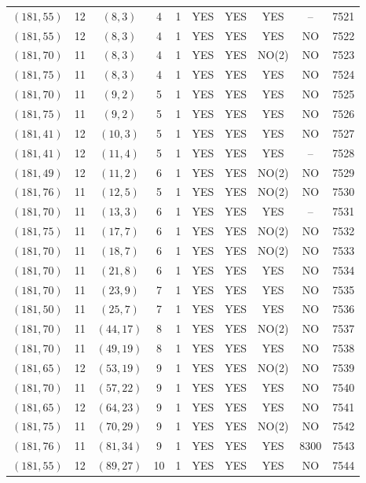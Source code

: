 \begin{longtable}{|c|c|c|c|c|c|c|c|c|c|}
$(181, 55)$ & 12 & $(8, 3)$ & 4 & 1 & YES & YES & YES & -- & 7521\\
$(181, 55)$ & 12 & $(8, 3)$ & 4 & 1 & YES & YES & YES & NO & 7522\\
$(181, 70)$ & 11 & $(8, 3)$ & 4 & 1 & YES & YES & NO(2) & NO & 7523\\
$(181, 75)$ & 11 & $(8, 3)$ & 4 & 1 & YES & YES & YES & NO & 7524\\
$(181, 70)$ & 11 & $(9, 2)$ & 5 & 1 & YES & YES & YES & NO & 7525\\
$(181, 75)$ & 11 & $(9, 2)$ & 5 & 1 & YES & YES & YES & NO & 7526\\
$(181, 41)$ & 12 & $(10, 3)$ & 5 & 1 & YES & YES & YES & NO & 7527\\
$(181, 41)$ & 12 & $(11, 4)$ & 5 & 1 & YES & YES & YES & -- & 7528\\
$(181, 49)$ & 12 & $(11, 2)$ & 6 & 1 & YES & YES & NO(2) & NO & 7529\\
$(181, 76)$ & 11 & $(12, 5)$ & 5 & 1 & YES & YES & NO(2) & NO & 7530\\
$(181, 70)$ & 11 & $(13, 3)$ & 6 & 1 & YES & YES & YES & -- & 7531\\
$(181, 75)$ & 11 & $(17, 7)$ & 6 & 1 & YES & YES & NO(2) & NO & 7532\\
$(181, 70)$ & 11 & $(18, 7)$ & 6 & 1 & YES & YES & NO(2) & NO & 7533\\
$(181, 70)$ & 11 & $(21, 8)$ & 6 & 1 & YES & YES & YES & NO & 7534\\
$(181, 70)$ & 11 & $(23, 9)$ & 7 & 1 & YES & YES & YES & NO & 7535\\
$(181, 50)$ & 11 & $(25, 7)$ & 7 & 1 & YES & YES & YES & NO & 7536\\
$(181, 70)$ & 11 & $(44, 17)$ & 8 & 1 & YES & YES & NO(2) & NO & 7537\\
$(181, 70)$ & 11 & $(49, 19)$ & 8 & 1 & YES & YES & YES & NO & 7538\\
$(181, 65)$ & 12 & $(53, 19)$ & 9 & 1 & YES & YES & NO(2) & NO & 7539\\
$(181, 70)$ & 11 & $(57, 22)$ & 9 & 1 & YES & YES & YES & NO & 7540\\
$(181, 65)$ & 12 & $(64, 23)$ & 9 & 1 & YES & YES & YES & NO & 7541\\
$(181, 75)$ & 11 & $(70, 29)$ & 9 & 1 & YES & YES & NO(2) & NO & 7542\\
$(181, 76)$ & 11 & $(81, 34)$ & 9 & 1 & YES & YES & YES & 8300 & 7543\\
$(181, 55)$ & 12 & $(89, 27)$ & 10 & 1 & YES & YES & YES & NO & 7544\\

\end{longtable}
